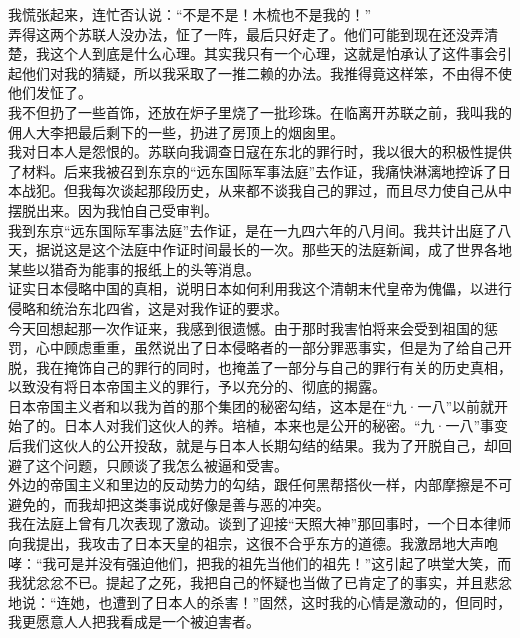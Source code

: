 我慌张起来，连忙否认说：“不是不是！木梳也不是我的！”\\

弄得这两个苏联人没办法，怔了一阵，最后只好走了。他们可能到现在还没弄清楚，我这个人到底是什么心理。其实我只有一个心理，这就是怕承认了这件事会引起他们对我的猜疑，所以我采取了一推二赖的办法。我推得竟这样笨，不由得不使他们发怔了。\\

我不但扔了一些首饰，还放在炉子里烧了一批珍珠。在临离开苏联之前，我叫我的佣人大李把最后剩下的一些，扔进了房顶上的烟囱里。\\

我对日本人是怨恨的。苏联向我调查日寇在东北的罪行时，我以很大的积极性提供了材料。后来我被召到东京的“远东国际军事法庭”去作证，我痛快淋漓地控诉了日本战犯。但我每次谈起那段历史，从来都不谈我自己的罪过，而且尽力使自己从中摆脱出来。因为我怕自己受审判。\\

我到东京“远东国际军事法庭”去作证，是在一九四六年的八月间。我共计出庭了八天，据说这是这个法庭中作证时间最长的一次。那些天的法庭新闻，成了世界各地某些以猎奇为能事的报纸上的头等消息。\\

证实日本侵略中国的真相，说明日本如何利用我这个清朝末代皇帝为傀儡，以进行侵略和统治东北四省，这是对我作证的要求。\\

今天回想起那一次作证来，我感到很遗憾。由于那时我害怕将来会受到祖国的惩罚，心中顾虑重重，虽然说出了日本侵略者的一部分罪恶事实，但是为了给自己开脱，我在掩饰自己的罪行的同时，也掩盖了一部分与自己的罪行有关的历史真相，以致没有将日本帝国主义的罪行，予以充分的、彻底的揭露。\\

日本帝国主义者和以我为首的那个集团的秘密勾结，这本是在“九·一八”以前就开始了的。日本人对我们这伙人的养。培植，本来也是公开的秘密。“九·一八”事变后我们这伙人的公开投敌，就是与日本人长期勾结的结果。我为了开脱自己，却回避了这个问题，只顾谈了我怎么被逼和受害。\\

外边的帝国主义和里边的反动势力的勾结，跟任何黑帮搭伙一样，内部摩擦是不可避免的，而我却把这类事说成好像是善与恶的冲突。\\

我在法庭上曾有几次表现了激动。谈到了迎接“天照大神”那回事时，一个日本律师向我提出，我攻击了日本天皇的祖宗，这很不合乎东方的道德。我激昂地大声咆哮：“我可是并没有强迫他们，把我的祖先当他们的祖先！”这引起了哄堂大笑，而我犹忿忿不已。提起了之死，我把自己的怀疑也当做了已肯定了的事实，并且悲忿地说：“连她，也遭到了日本人的杀害！”固然，这时我的心情是激动的，但同时，我更愿意人人把我看成是一个被迫害者。\\


